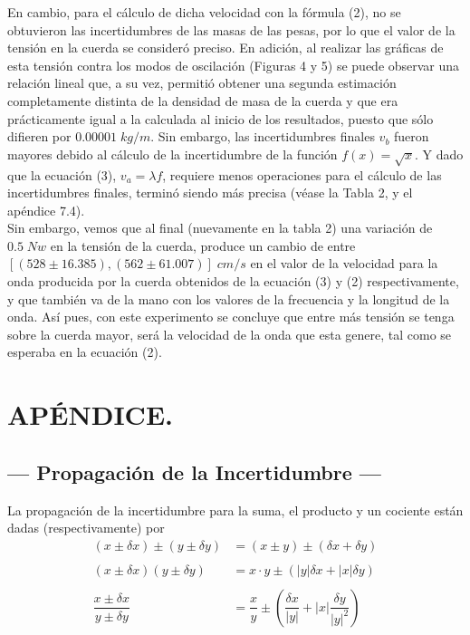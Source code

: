 \documentclass[10pt,a4paper]{article}
\begin{document}
En cambio, para el cálculo de dicha velocidad con la fórmula (2), no se obtuvieron las incertidumbres de las masas de las pesas,  por lo que el valor de la tensión en la cuerda se consideró preciso.
En adición, al realizar las gráficas de esta tensión contra los modos de oscilación (Figuras 4 y 5)  se puede observar una relación lineal que, a su vez, permitió obtener una segunda estimación completamente distinta de la densidad de masa de la cuerda y que era prácticamente igual a la calculada al inicio de los resultados, puesto que sólo difieren por $0.00001 \;kg/m$. Sin embargo, las incertidumbres finales $v_b$ fueron mayores debido al cálculo de la incertidumbre de la función $f(x)=\sqrt{x}$.
Y dado que la ecuación (3), $v_a=\lambda f$, requiere menos operaciones para el cálculo de las incertidumbres finales, terminó siendo más precisa (véase la Tabla 2, y el apéndice 7.4). \\[2mm]

Sin embargo, vemos que al final (nuevamente en la tabla 2) una variación de $0.5\;Nw$ en la tensión de la cuerda, produce un cambio de entre \([(528 \pm 16.385), (562\pm 61.007)]\;cm/s\) en el valor de la velocidad para la onda producida por la cuerda obtenidos de la ecuación (3) y (2) respectivamente, y que también va de la mano con los valores de la frecuencia y la longitud de la onda.
Así pues, con este experimento se concluye que entre más tensión se tenga sobre la cuerda mayor, será la velocidad de la onda que esta genere, tal como se esperaba en la ecuación (2).




\section{APÉNDICE.} %
	\subsection{--- Propagación de la Incertidumbre ---}
	
	La propagación de la incertidumbre para la suma, el producto y un cociente están dadas (respectivamente) por
	\begin{align*}
		(x\pm \delta x)\pm(y\pm \delta y)&=(x\pm y)\pm(\delta x+\delta y)\\\\
		(x\pm\delta x)(y\pm\delta y)&=x\cdot y\pm\left(|y|\delta x+|x|\delta y \right)\\\\
		\dfrac{x\pm\delta x}{y\pm\delta y}&=\dfrac{x}{y}\pm\left(\dfrac{\delta x}{|y|}+|x|\dfrac{\delta y}{|y|^2}\right)
	\end{align*}
	
\end{document}
